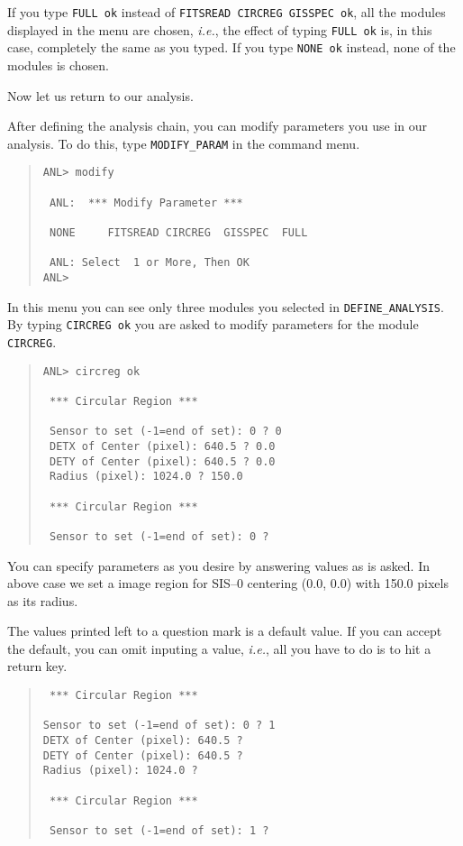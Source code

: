 If you type {\tt FULL ok} instead of {\tt FITSREAD CIRCREG GISSPEC ok},
all the modules displayed in the menu are chosen,
{\em i.e.},
the effect of typing {\tt FULL ok} is,
in this case,
completely the same as you typed.
If you type {\tt NONE ok} instead,
none of the modules is chosen.

Now let us return to our analysis.

After defining the analysis chain,
you can modify parameters you use in our analysis.
To do this,
type {\tt MODIFY\_PARAM} in the command menu.

\begin{quote}\baselineskip 3.2mm\begin{verbatim}
ANL> modify

 ANL:  *** Modify Parameter ***

 NONE     FITSREAD CIRCREG  GISSPEC  FULL

 ANL: Select  1 or More, Then OK
ANL> 
\end{verbatim}\end{quote}

In this menu
you can see only three modules you selected in {\tt DEFINE\_ANALYSIS}.
By typing {\tt CIRCREG ok}
you are asked to modify parameters for the module {\tt CIRCREG}.

\begin{quote}\baselineskip 3.2mm\begin{verbatim}
ANL> circreg ok

 *** Circular Region ***

 Sensor to set (-1=end of set): 0 ? 0
 DETX of Center (pixel): 640.5 ? 0.0
 DETY of Center (pixel): 640.5 ? 0.0
 Radius (pixel): 1024.0 ? 150.0

 *** Circular Region ***

 Sensor to set (-1=end of set): 0 ? 
\end{verbatim}\end{quote}

You can specify parameters as you desire
by answering values as is asked.
In above case
we set a image region for SIS--0
centering (0.0, 0.0) with 150.0 pixels as its radius.

The values printed left to a question mark is a default value.
If you can accept the default,
you can omit inputing a value,
{\em i.e.},
all you have to do is to hit a return key.

\begin{quote}\baselineskip 3.2mm\begin{verbatim}
 *** Circular Region ***

Sensor to set (-1=end of set): 0 ? 1
DETX of Center (pixel): 640.5 ?
DETY of Center (pixel): 640.5 ?
Radius (pixel): 1024.0 ?

 *** Circular Region ***

 Sensor to set (-1=end of set): 1 ? 
\end{verbatim}\end{quote}

